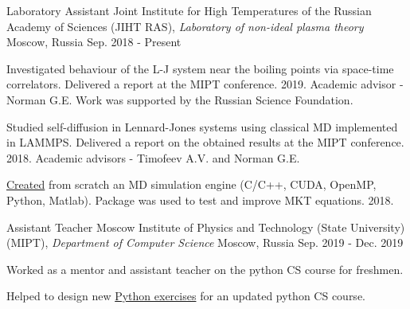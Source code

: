 

\begin{cventries}

  \cventry
    {Laboratory Assistant} %
    {Joint Institute for High Temperatures of the Russian Academy of Sciences (JIHT RAS), \textit{Laboratory of non-ideal plasma theory}} %
    {Moscow, Russia} %
    {Sep. 2018 - Present} %
    {
      \begin{cvitems} %
        \item {Investigated behaviour of the L-J system near the boiling points via space-time correlators. Delivered a report at the MIPT conference. 2019. Academic advisor - Norman G.E. Work was supported by the Russian Science Foundation.}
      	\item {Studied self-diffusion in Lennard-Jones systems using classical MD implemented in LAMMPS. Delivered a report on the obtained results at the MIPT conference. 2018. Academic advisors - Timofeev A.V. and Norman G.E. }
      	\item {\href{https://github.com/PolyachenkoYA/molecules}{Created} from scratch an MD simulation engine (C/C++, CUDA, OpenMP, Python, Matlab). Package was used to test and improve MKT equations.  2018.}
      \end{cvitems}
    }

  \cventry
    {Assistant Teacher} %
    {Moscow Institute of Physics and Technology (State University) (MIPT), \newline \textit{Department of Computer Science}} %
    {Moscow, Russia} %
    {Sep. 2019 - Dec. 2019} %
    {
      \begin{cvitems} %
        \item {Worked as a mentor and assistant teacher on the python CS course for freshmen.}
        \item {Helped to design new \href{http://cs.mipt.ru/python}{Python exercises} for an updated python CS course.}
      \end{cvitems}
    }
    

\end{cventries}
